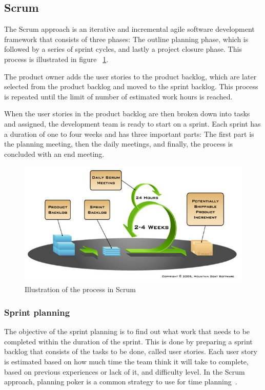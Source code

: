 \newpage
\subsection{Scrum}

\label{sec:scrumProjectManagement}

The Scrum approach is an iterative and incremental agile software development
framework that consists of three phases: The outline planning phase, which is
followed by a series of sprint cycles, and lastly a project closure phase. This process is illustrated in figure ~\ref{fig:scrumProcess}.

The product owner adds the user stories to the product backlog, which are later selected from the product backlog and moved to the sprint backlog. This process is repeated until the limit of number of estimated work hours is reached. 

When the user stories in the product backlog are then broken down into tasks and assigned, the development team is ready to start on a sprint. Each sprint has a duration of one to four weeks and has three important parts: The first part is the
planning meeting, then the daily  meetings, and finally, the process is
concluded with an end meeting. 
\begin{figure}[H]
\includegraphics[width=\textwidth]{ch/projectManagement/fig/sprintProcess.jpg}
\caption{Illustration of the process in Scrum}
\label{fig:scrumProcess}
\end{figure}


\subsubsection{Sprint planning}
\label{sec:sprintplanning}
The objective of the sprint planning is to find out what work that needs to be completed within the duration of the sprint. This is done by preparing a sprint backlog that consists of the tasks to be done, called user stories. Each user story is estimated based on how much time the team think it will take to complete, based on previous experiences or lack of it, and difficulty level. In the Scrum approach, planning poker is a common strategy to use for time planning~\cite{planningpoker}.

